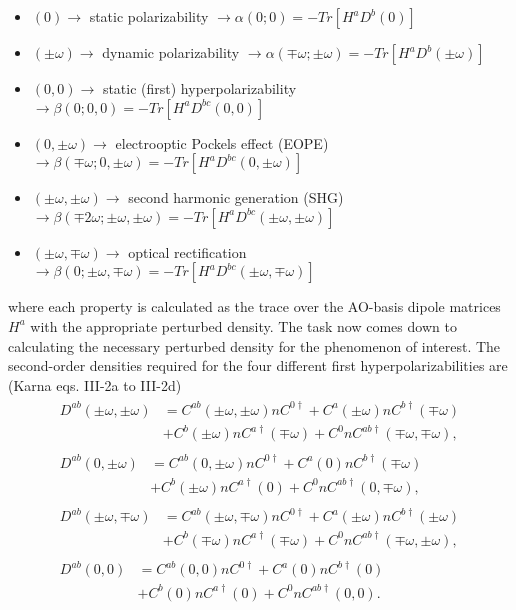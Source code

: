\begin{itemize}
\item \((0) \rightarrow\) static polarizability \(\rightarrow \alpha(0;0) = -Tr[H^{a} D^{b}(0)]\)
\item \((\pm\omega) \rightarrow\) dynamic polarizability \(\rightarrow \alpha(\mp\omega;\pm\omega) = -Tr[H^{a} D^{b}(\pm\omega)]\)
\item \((0,0) \rightarrow\) static (first) hyperpolarizability \(\rightarrow \beta(0;0,0) = -Tr[H^{a} D^{bc}(0,0)]\)
\item \((0,\pm\omega) \rightarrow\) electrooptic Pockels effect (EOPE) \(\rightarrow \beta(\mp \omega;0,\pm\omega) = -Tr[H^{a} D^{bc}(0,\pm\omega)]\)
\item \((\pm\omega,\pm\omega) \rightarrow\) second harmonic generation (SHG) \\
  \(\rightarrow \beta(\mp 2\omega;\pm\omega,\pm\omega) = -Tr[H^{a} D^{bc}(\pm\omega,\pm\omega)]\)
\item \((\pm\omega,\mp\omega) \rightarrow\) optical rectification \(\rightarrow \beta(0;\pm\omega,\mp\omega) = -Tr[H^{a} D^{bc}(\pm\omega,\mp\omega)]\)
\end{itemize}
where each property is calculated as the trace over the AO-basis dipole matrices \(H^{a}\) with the appropriate perturbed density. The task now comes down to calculating the necessary perturbed density for the phenomenon of interest. The second-order densities required for the four different first hyperpolarizabilities are (Karna eqs. III-2a to III-2d)
\begin{align}
  \begin{split}
    D^{ab}(\pm\omega,\pm\omega) &= C^{ab}(\pm\omega,\pm\omega) n C^{0\dagger} + C^{a}(\pm\omega) n C^{b\dagger}(\mp\omega) \\
    &+ C^{b}(\pm\omega) n C^{a\dagger}(\mp\omega) + C^{0} n C^{ab\dagger}(\mp\omega,\mp\omega),
  \end{split} \\
  \begin{split}
    D^{ab}(0,\pm\omega) &= C^{ab}(0,\pm\omega) n C^{0\dagger} + C^{a}(0) n C^{b\dagger}(\mp\omega) \\
    &+ C^{b}(\pm\omega) n C^{a\dagger}(0) + C^{0} n C^{ab\dagger}(0,\mp\omega),
  \end{split} \\
  \begin{split}
    D^{ab}(\pm\omega,\mp\omega) &= C^{ab}(\pm\omega,\mp\omega) n C^{0\dagger} + C^{a}(\pm\omega) n C^{b\dagger}(\pm\omega) \\
    &+ C^{b}(\mp\omega) n C^{a\dagger}(\mp\omega) + C^{0} n C^{ab\dagger}(\mp\omega,\pm\omega),
  \end{split} \\
  \begin{split}
    D^{ab}(0,0) &= C^{ab}(0,0) n C^{0\dagger} + C^{a}(0) n C^{b\dagger}(0) \\
    &+ C^{b}(0) n C^{a\dagger}(0) + C^{0} n C^{ab\dagger}(0,0).
  \end{split}
\end{align}
